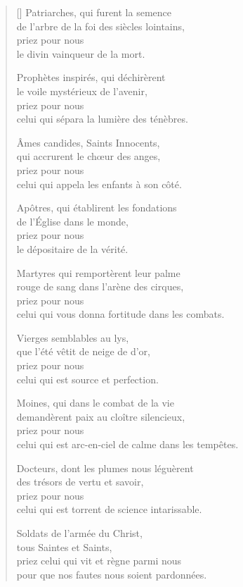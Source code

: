 \documentclass[a4paper,12pt]{book}
\begin{document}

\begin{verse}[\versewidth]
  Patriarches, qui furent la semence \\
  de l'arbre de la foi des siècles lointains, \\
  priez pour nous \\
  le divin vainqueur de la mort.

  Prophètes inspirés, qui déchirèrent \\
  le voile mystérieux de l'avenir, \\
  priez pour nous \\
  celui qui sépara la lumière des ténèbres.

  Âmes candides, Saints Innocents, \\
  qui accrurent le chœur des anges, \\
  priez pour nous \\
  celui qui appela les enfants à son côté.

  Apôtres, qui établirent les fondations \\
  de l'Église dans le monde, \\
  priez pour nous \\
  le dépositaire de la vérité.

  Martyres qui remportèrent leur palme \\
  rouge de sang dans l'arène des cirques, \\
  priez pour nous \\
  celui qui vous donna fortitude dans les combats.

  Vierges semblables au lys, \\
  que l'été vêtit de neige de d'or, \\
  priez pour nous \\
  celui qui est source et perfection.

  Moines, qui dans le combat de la vie \\
  demandèrent paix au cloître silencieux, \\
  priez pour nous \\
  celui qui est arc-en-ciel de calme dans les tempêtes.

  Docteurs, dont les plumes nous léguèrent \\
  des trésors de vertu et savoir, \\
  priez pour nous \\
  celui qui est torrent de science intarissable.

  Soldats de l'armée du Christ, \\
  tous Saintes et Saints, \\
  priez celui qui vit et règne parmi nous \\
  pour que nos fautes nous soient pardonnées.
\end{verse}
\end{document}
